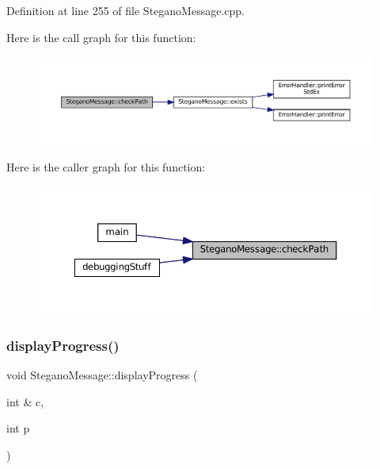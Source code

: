 Definition at line 255 of file Stegano\+Message.\+cpp.

Here is the call graph for this function\+:\nopagebreak
\begin{figure}[H]
\begin{center}
\leavevmode
\includegraphics[width=350pt]{classSteganoMessage_a9d87adef1584cc184ccd4b5d86fba744_cgraph}
\end{center}
\end{figure}
Here is the caller graph for this function\+:\nopagebreak
\begin{figure}[H]
\begin{center}
\leavevmode
\includegraphics[width=350pt]{classSteganoMessage_a9d87adef1584cc184ccd4b5d86fba744_icgraph}
\end{center}
\end{figure}
\mbox{\label{classSteganoMessage_a50936bb2352eaaa1112280c2ac3ca2d5}} 
\subsubsection{\texorpdfstring{displayProgress()}{displayProgress()}\hspace{0.1cm}{\footnotesize\ttfamily [1/2]}}
{\footnotesize\ttfamily void Stegano\+Message\+::display\+Progress (\begin{DoxyParamCaption}\item[{int \&}]{c,  }\item[{int}]{p }\end{DoxyParamCaption})\hspace{0.3cm}{\ttfamily [private]}}



